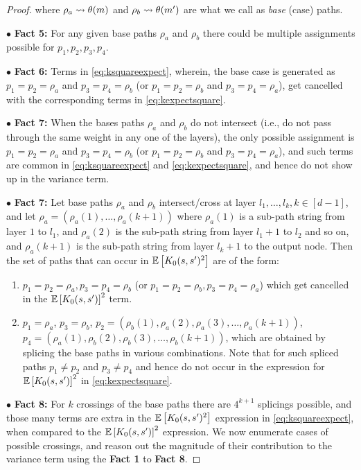 \begin{proof}
where $\rho_a\rightsquigarrow \theta(m)$ and $\rho_b\rightsquigarrow \theta(m')$ are what we call as \emph{base} (case) paths. 


$\bullet$ \textbf{Fact 5:} For any given base paths $\rho_a$ and $\rho_b$ there could be multiple assignments possible for $p_1,p_2,p_3,p_4$.

$\bullet$ \textbf{Fact 6:}  Terms in \eqref{eq:ksquareexpect}, wherein, the base case is generated as $p_1=p_2=\rho_a$ and $p_3=p_4=\rho_b$ (or $p_1=p_2=\rho_b$ and $p_3=p_4=\rho_a$), get cancelled with the corresponding terms in \eqref{eq:kexpectsquare}.

$\bullet$ \textbf{Fact 7:}  When the bases paths $\rho_a$ and $\rho_b$ do not intersect (i.e., do not pass through the same weight in any one of the layers), the only possible assignment is $p_1=p_2=\rho_a$ and $p_3=p_4=\rho_b$ (or $p_1=p_2=\rho_b$ and $p_3=p_4=\rho_a$), and such terms are common in \eqref{eq:ksquareexpect} and \eqref{eq:kexpectsquare}, and hence do not show up in the variance term.


$\bullet$ \textbf{Fact 7:} Let base paths $\rho_a$ and $\rho_b$ intersect/cross at layer $l_1, \ldots, l_k, k \in [d-1]$, and let $\rho_a=(\rho_a(1),\ldots,\rho_a(k+1))$ where $\rho_a(1)$ is a sub-path string from layer $1$ to $l_1$, and $\rho_a(2)$ is the sub-path string from layer $l_1+1$ to $l_2$ and so on, and $\rho_a(k+1)$ is the sub-path string from layer $l_k+1$ to the output node. Then the set of paths that can occur in $\mathbb{E}\left[K_0(s,s')^2\right]$ are of the form:
\begin{enumerate}
\item $p_1=p_2=\rho_a, p_3=p_4=\rho_b$ (or $p_1=p_2=\rho_b, p_3=p_4=\rho_a$) which get cancelled in the $\mathbb{E}\left[K_0(s,s')\right]^2$ term.
\item $p_1=\rho_a$, $p_3=\rho_b$, $p_2=(\rho_b(1),\rho_a(2),\rho_a(3),\ldots,\rho_a(k+1))$, $p_4=(\rho_a(1),\rho_b(2),\rho_b(3),\ldots,\rho_b(k+1))$, which are obtained by splicing the base paths in various combinations. Note that for such spliced paths $p_1\neq p_2$ and $p_3\neq p_4$ and hence do not occur in the expression for $\mathbb{E}\left[K_0(s,s')\right]^2$ in \eqref{eq:kexpectsquare}.
\end{enumerate}


$\bullet$ \textbf{Fact 8:} For $k$ crossings of the base paths there are $4^{k+1}$ splicings possible, and those many terms are extra in the $\mathbb{E}\left[K_0(s,s')^2\right]$ expression in \eqref{eq:ksquareexpect}, when compared to the $\mathbb{E}\left[K_0(s,s')\right]^2$ expression. We now enumerate cases of possible crossings, and reason out the magnitude of their contribution to the variance term using the \textbf{Fact 1} to \textbf{Fact 8}.



\end{proof}
